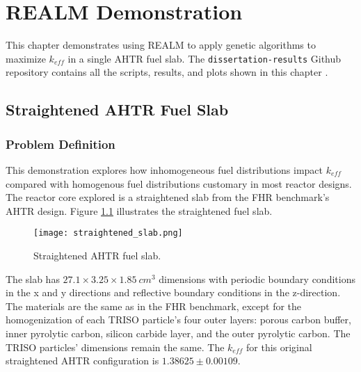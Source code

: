 \chapter{REALM Demonstration}
\label{chap:realm-demo}
This chapter demonstrates using \gls{REALM} to apply genetic algorithms 
to maximize $k_{eff}$ in a single \gls{AHTR} fuel slab. 
The \texttt{dissertation-results} Github repository contains all the scripts, 
results, and plots shown in this chapter \cite{chee_dissertation-results_2021}.

\section{Straightened AHTR Fuel Slab}
\subsection{Problem Definition}
This demonstration explores how inhomogeneous fuel distributions impact $k_{eff}$ 
compared with homogenous fuel distributions customary in most reactor designs. 
The reactor core explored is a straightened slab from the \gls{FHR} benchmark's
\gls{AHTR} design.
Figure \ref{fig:straightened_slab} illustrates the straightened fuel slab. 
\begin{figure}[]
    \centering
    \texttt{[image: straightened\_slab.png]}
    \raggedright
    \caption{Straightened \acrfull{AHTR} fuel slab.}
    \label{fig:straightened_slab}
\end{figure}
The slab has $27.1 \times 3.25 \times 1.85\ cm^3$ dimensions
with periodic boundary conditions in the x and y directions and reflective 
boundary conditions in the z-direction. 
The materials are the same as in the \gls{FHR} benchmark, except for 
the homogenization of each \gls{TRISO} particle's four outer layers: 
porous carbon buffer, inner pyrolytic carbon, silicon carbide layer, and the 
outer pyrolytic carbon. 
The \gls{TRISO} particles' dimensions remain the same.
The $k_{eff}$ for this original straightened \gls{AHTR} configuration is 
$1.38625 \pm 0.00109$. 

